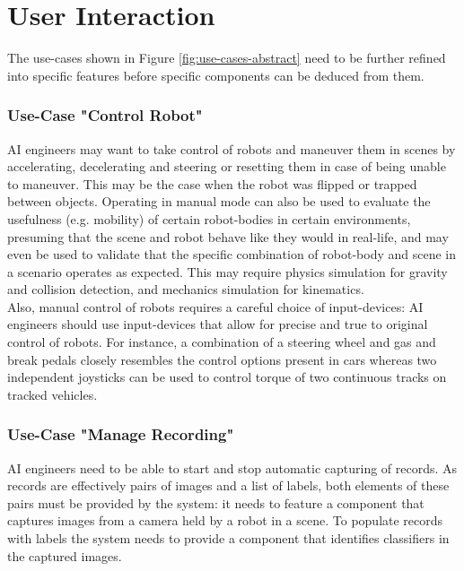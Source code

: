 
\section{User Interaction}
The use-cases shown in Figure \ref{fig:use-cases-abstract} need to be further refined into specific features before specific components can be deduced from them.

\subsubsection{Use-Case "Control Robot"}
\acs{AI} engineers may want to take control of robots and maneuver them in scenes by accelerating, decelerating and steering or resetting them in case of being unable to maneuver. This may be the case when the robot was flipped or trapped between objects. Operating in manual mode can also be used to evaluate the usefulness (e.g. mobility) of certain robot-bodies in certain environments, presuming that the scene and robot behave like they would in real-life, and may even be used to validate that the specific combination of robot-body and scene in a scenario operates as expected. This may require physics simulation for gravity and collision detection, and mechanics simulation for kinematics.\\
Also, manual control of robots requires a careful choice of input-devices: \acs{AI} engineers should use input-devices that allow for precise and true to original control of robots. For instance, a combination of a steering wheel and gas and break pedals closely resembles the control options present in cars whereas two independent joysticks can be used to control torque of two continuous tracks on tracked vehicles.

\subsubsection{Use-Case "Manage Recording"}
\acs{AI} engineers need to be able to start and stop automatic capturing of records. As records are effectively pairs of images and a list of labels, both elements of these pairs must be provided by the system: it needs to feature a component that captures images from a camera held by a robot in a scene. To populate records with labels the system needs to provide a component that identifies classifiers in the captured images.

